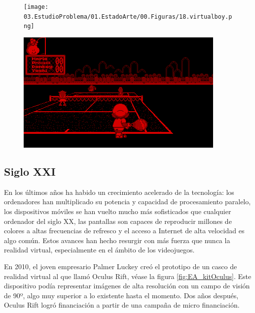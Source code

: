 \begin{figure}
\centering
\begin{minipage}{.5\textwidth}
  \centering
  \texttt{[image: 03.EstudioProblema/01.EstadoArte/00.Figuras/18.virtualboy.png]}
  \label{fig:EA_virtualBoy}
\end{minipage}%
\begin{minipage}{.5\textwidth}
  \centering
  \includegraphics[width=.9\linewidth]{03.EstudioProblema/01.EstadoArte/00.Figuras/19.marios_tennis.png}
  \label{fig:EA_virtualBoyJuego}
\end{minipage}
\end{figure}



\subsection{Siglo XXI}

En los últimos años ha habido un crecimiento acelerado de la tecnología: los ordenadores han multiplicado su potencia y capacidad de procesamiento paralelo, los dispositivos móviles se han vuelto mucho más sofisticados que cualquier ordenador del siglo XX, las pantallas son capaces de reproducir millones de colores a altas frecuencias de refresco y el acceso a Internet de alta velocidad es algo común. Estos avances han hecho resurgir con más fuerza que nunca la realidad virtual, especialmente en el ámbito de los videojuegos.

En 2010, el joven empresario Palmer Luckey creó el prototipo de un casco de realidad virtual al que llamó Oculus Rift, véase la figura \ref{fig:EA_kitOculus}. Este dispositivo podía representar imágenes de alta resolución con un campo de visión de 90º, algo muy superior a lo existente hasta el momento. \cite{EA_vr_oculusrift} Dos años después, Oculus Rift logró financiación a partir de una campaña de micro financiación. 


